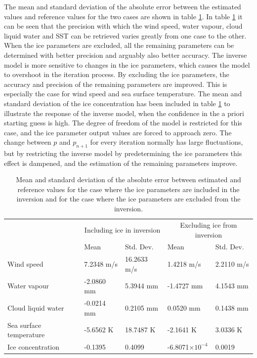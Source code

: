 \documentclass[11pt, a4paper]{article}
\begin{document}
The mean and standard deviation of the absolute error between the estimated values and reference values for the two cases are shown in table \ref{tab:task6_tab_1}. In table \ref{tab:task6_tab_1} it can be seen that the precision with which the wind speed, water vapour, cloud liquid water and SST can be retrieved varies greatly from one case to the other. When the ice parameters are excluded, all the remaining parameters can be determined with better precision and arguably also better accuracy. The inverse model is more sensitive to changes in the ice parameters, which causes the model to overshoot in the iteration process. By excluding the ice parameters, the accuracy and precision of the remaining parameters are improved. This is especially the case for wind speed and sea surface temperature. The mean and standard deviation of the ice concentration has been included in table \ref{tab:task6_tab_1} to illustrate the response of the inverse model, when the confidence in the a priori starting guess is high. The degree of freedom of the model is restricted for this case, and the ice parameter output values are forced to approach zero. The change between \(p\) and \(p_{n+1}\) for every iteration normally has large fluctuations, but by restricting the inverse model by predetermining the ice parameters this effect is dampened, and the estimation of the remaining parameters improve.

\begin{table}[h!]
	\centering
	\begin{tabular}{@{}p{4.0cm} p{2.4cm}p{2.4cm}p{2.4cm}p{2.4cm}@{}}
		\tabularnewline
		& \multicolumn{2}{c}{Including ice in inversion} & \multicolumn{2}{c}{Excluding ice from inversion}
		\tabularnewline
		\cmidrule(r{1em}){2-3} \cmidrule(l{1em}){4-5}
		& Mean & Std. Dev. & Mean & Std. Dev.
		\tabularnewline
		\midrule
		Wind speed	& 7.2348 m/s	& 16.2633 m/s		& 1.4218 m/s	& 2.2110 m/s	\\
		Water vapour		& -2.0860 mm	& 5.3944 mm		& -1.4727 mm	& 	4.1543 mm	\\
		Cloud liquid water		& -0.0214 mm	& 0.2105 mm	& 0.0520 mm	& 0.1438 mm	\\
		Sea surface temperature	& -5.6562 K	& 18.7487 K	& -2.1641 K	& 3.0336 K	\\
		Ice concentration  & -0.1395 & 0.4099 & -6.8071$\times10^{-4}$  & 0.0019 \\
		\midrule
	\end{tabular}
	\caption{Mean and standard deviation of the absolute error between estimated and reference values for the case where the ice parameters are included in the inversion and for the case where the ice parameters are excluded from the inversion.}
	\label{tab:task6_tab_1}
\end{table}
 
\end{document}
